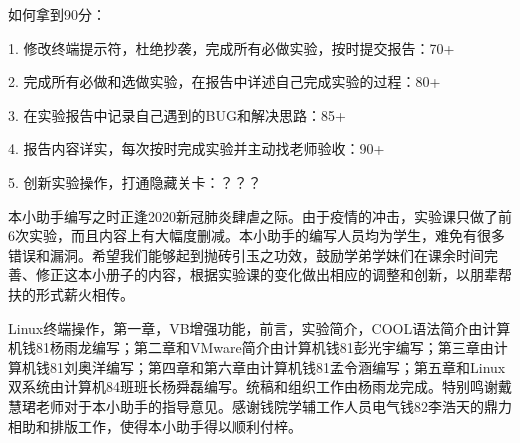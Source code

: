 \documentclass[
  10pt,
  twoside,
  openany,
  b5paper, %
  colorscheme = basic, %
]{qyxf-book}
\begin{document}
如何拿到90分：

1.	修改终端提示符，杜绝抄袭，完成所有必做实验，按时提交报告：70+

2.	完成所有必做和选做实验，在报告中详述自己完成实验的过程：80+

3.	在实验报告中记录自己遇到的BUG和解决思路：85+

4.	报告内容详实，每次按时完成实验并主动找老师验收：90+

5.	创新实验操作，打通隐藏关卡：？？？

本小助手编写之时正逢2020新冠肺炎肆虐之际。由于疫情的冲击，实验课只做了前6次实验，而且内容上有大幅度删减。本小助手的编写人员均为学生，难免有很多错误和漏洞。希望我们能够起到抛砖引玉之功效，鼓励学弟学妹们在课余时间完善、修正这本小册子的内容，根据实验课的变化做出相应的调整和创新，以朋辈帮扶的形式薪火相传。

Linux终端操作，第一章，VB增强功能，前言，实验简介，COOL语法简介由计算机钱81杨雨龙编写；第二章和VMware简介由计算机钱81彭光宇编写；第三章由计算机钱81刘奥洋编写；第四章和第六章由计算机钱81孟令涵编写；第五章和Linux双系统由计算机84班班长杨舜磊编写。统稿和组织工作由杨雨龙完成。特别鸣谢戴慧珺老师对于本小助手的指导意见。感谢钱院学辅工作人员电气钱82李浩天的鼎力相助和排版工作，使得本小助手得以顺利付梓。
\thispagestyle{empty}



\newpage
\setcounter{page}{1}



\end{document}
